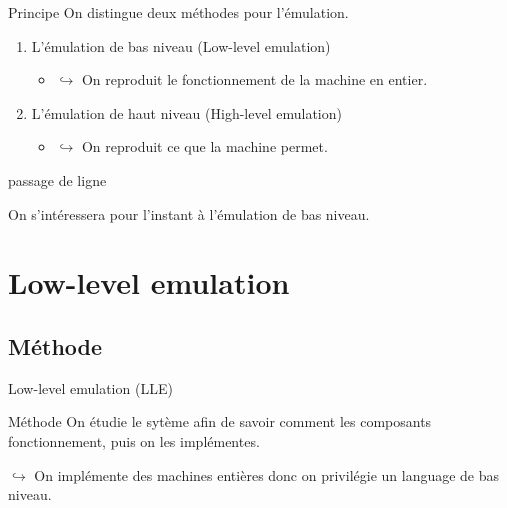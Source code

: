 \documentclass{beamer}
\begin{document}
    \begin{frame}{Principe}
        On distingue deux méthodes pour l'émulation.
        \begin{enumerate}
            \item L'émulation de bas niveau (Low-level emulation)
            \begin{itemize}
                \item[\color{white}] $\hookrightarrow$ On reproduit le fonctionnement de la machine en entier.
            \end{itemize}
            \item L'émulation de haut niveau (High-level emulation)
            \begin{itemize}
                \item[\color{white}] $\hookrightarrow$ On reproduit ce que la machine permet.
            \end{itemize}
        \end{enumerate}
        {\color{white} passage de ligne}

        On s'intéressera pour l'instant à l'émulation de bas niveau.
    \end{frame}

    \section{Low-level emulation}
    \subsection{Méthode}
    \begin{frame}{Low-level emulation (LLE)}
        \begin{exampleblock}{Méthode}
            On étudie le sytème afin de savoir comment les composants fonctionnement, puis on les implémentes.
        \end{exampleblock}
        $\hookrightarrow$ On implémente des machines entières donc on privilégie un language de bas niveau.
    \end{frame}
\end{document}
